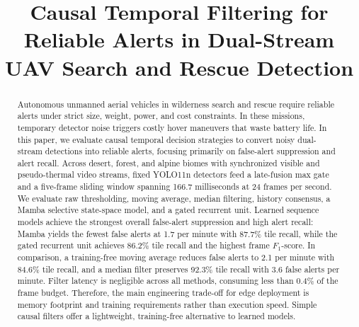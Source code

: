 \documentclass[conference]{IEEEtran}
\begin{document}
\title{Causal Temporal Filtering for Reliable Alerts in Dual-Stream UAV Search and Rescue Detection}
\author{
\and
{}
}

\maketitle

\begingroup
\renewcommand\thefootnote{}
\endgroup

\begin{abstract}
Autonomous unmanned aerial vehicles in wilderness search and rescue require reliable alerts under strict size, weight, power, and cost constraints. In these missions, temporary detector noise triggers costly hover maneuvers that waste battery life. In this paper, we evaluate causal temporal decision strategies to convert noisy dual-stream detections into reliable alerts, focusing primarily on false-alert suppression and alert recall. Across desert, forest, and alpine biomes with synchronized visible and pseudo-thermal video streams, fixed YOLO11n detectors feed a late-fusion max gate and a five-frame sliding window spanning 166.7 milliseconds at 24 frames per second. We evaluate raw thresholding, moving average, median filtering, history consensus, a Mamba selective state-space model, and a gated recurrent unit. Learned sequence models achieve the strongest overall false-alert suppression and high alert recall: Mamba yields the fewest false alerts at 1.7 per minute with 87.7\% tile recall, while the gated recurrent unit achieves 86.2\% tile recall and the highest frame $F_1$-score. In comparison, a training-free moving average reduces false alerts to 2.1 per minute with 84.6\% tile recall, and a median filter preserves 92.3\% tile recall with 3.6 false alerts per minute. Filter latency is negligible across all methods, consuming less than 0.4\% of the frame budget. Therefore, the main engineering trade-off for edge deployment is memory footprint and training requirements rather than execution speed. Simple causal filters offer a lightweight, training-free alternative to learned models.
\end{abstract}
\end{document}
